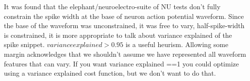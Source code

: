 It was found that the elephant/neuroelectro-suite of NU tests don't fully constrain the spike width at the base of neuron action potential waveform. Since the base of the waveform was unconstrained, it was free to vary, half-spike-width is constrained, it is more appropriate to talk about variance explained of the spike snippet. $variance explained>0.95$ is a useful heurism. Allowing some margin acknowledges that we shouldn't assume we have represented all waveform features that can vary. If you want variance explained ==1   you could optimize using a variance explained cost function, but we don't want to do that.




 


